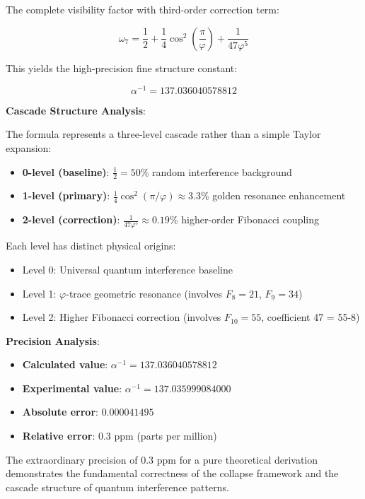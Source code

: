\documentclass[%
 reprint,
 amsmath,amssymb,
 aps,
 prd,
 10pt,
 nofootinbib,      %
 longbibliography  %
]{revtex4-2}
\theoremstyle{definition}
\theoremstyle{remark}
\begin{document}
The complete visibility factor with third-order correction term:

\begin{equation}
\boxed{\omega_7 = \frac{1}{2} + \frac{1}{4}\cos^2\left(\frac{\pi}{\varphi}\right) + \frac{1}{47\varphi^5}}
\end{equation}

This yields the high-precision fine structure constant:

\begin{equation}
\boxed{\alpha^{-1} = 137.036040578812}
\end{equation}

\textbf{Cascade Structure Analysis}:

The formula represents a three-level cascade rather than a simple Taylor expansion:

\begin{itemize}
\item \textbf{0-level (baseline)}: $\frac{1}{2} = 50\%$ random interference background
\item \textbf{1-level (primary)}: $\frac{1}{4}\cos^2(\pi/\varphi) \approx 3.3\%$ golden resonance enhancement
\item \textbf{2-level (correction)}: $\frac{1}{47\varphi^5} \approx 0.19\%$ higher-order Fibonacci coupling
\end{itemize}

Each level has distinct physical origins:
\begin{itemize}
\item Level 0: Universal quantum interference baseline
\item Level 1: $\varphi$-trace geometric resonance (involves $F_8 = 21$, $F_9 = 34$)
\item Level 2: Higher Fibonacci correction (involves $F_{10} = 55$, coefficient 47 = 55-8)
\end{itemize}

\textbf{Precision Analysis}:
\begin{itemize}
\item \textbf{Calculated value}: $\alpha^{-1} = 137.036040578812$
\item \textbf{Experimental value}: $\alpha^{-1} = 137.035999084000$
\item \textbf{Absolute error}: $0.000041495$
\item \textbf{Relative error}: $0.3$ ppm (parts per million)
\end{itemize}

The extraordinary precision of 0.3 ppm for a pure theoretical derivation demonstrates the fundamental correctness of the collapse framework and the cascade structure of quantum interference patterns.
\end{document}
